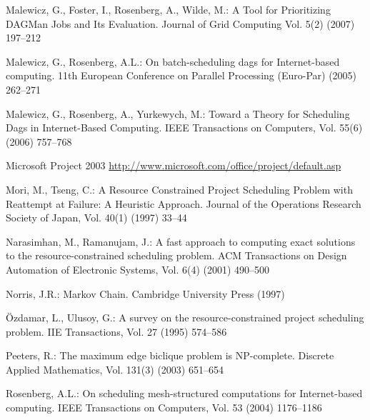 \documentclass[letterpaper,11pt]{article}
\newcommand{\remove}[1]{}
\begin{document}
\begin{thebibliography}{99}
Malewicz, G., Foster, I., Rosenberg, A., Wilde, M.: A Tool for Prioritizing DAGMan Jobs and Its Evaluation. Journal of Grid Computing Vol. 5(2) (2007) 197--212

Malewicz, G., Rosenberg, A.L.:
On batch-scheduling dags for
Internet-based computing. 
11th European Conference on Parallel Processing (Euro-Par) (2005) 262--271

Malewicz, G., Rosenberg, A., Yurkewych, M.: Toward a Theory for Scheduling Dags in Internet-Based Computing. IEEE Transactions on Computers, Vol. 55(6) (2006) 757--768 


Microsoft Project 2003
{\small\url{http://www.microsoft.com/office/project/default.asp}}

Mori, M., Tseng, C.:
A Resource Constrained Project Scheduling Problem with Reattempt at Failure: A Heuristic Approach.
Journal of the Operations Research Society of Japan, Vol. 40(1) (1997) 33--44

Narasimhan, M., Ramanujam, J.:
A fast approach to computing exact solutions to the resource-constrained scheduling problem. 
ACM Transactions on Design Automation of Electronic Systems,
Vol. 6(4) (2001) 490--500

Norris, J.R.:
Markov Chain.
Cambridge University Press (1997)

\"{O}zdamar, L., Ulusoy, G.:
A survey on the resource-constrained project scheduling problem.
IIE Transactions, Vol. 27 (1995) 574--586

\remove{************
\bibitem{Pag99}
Pagh, R.:
Hash and Displace: Efficient Evaluation of Minimal Perfect Hash Functions.
Workshop on Algorithms and Data Structures (WADS) (1999) 49--54
************}


\remove{
\bibitem{PatersonH70}
Paterson, M.S., Hewitt, C.E.:
Comparative schematology.
Project MAC Conference on Concurrent Systems and Parallel Computation, ACM Press (1970) 119--127
}

Peeters, R.:
The maximum edge biclique problem is {NP}-complete.
Discrete Applied Mathematics, Vol. 131(3) (2003)  651--654

Rosenberg, A.L.:
On scheduling mesh-structured computations for
Internet-based computing.
IEEE Transactions on Computers, Vol. 53 (2004) 1176--1186

\remove{
\bibitem{RosenbergS83}
Rosenberg, A.L., Sudborough, I.H.:
Bandwidth and pebbling.
Computing Vol.~31 (1983) 115--139
}


\end{thebibliography}
\end{document}
